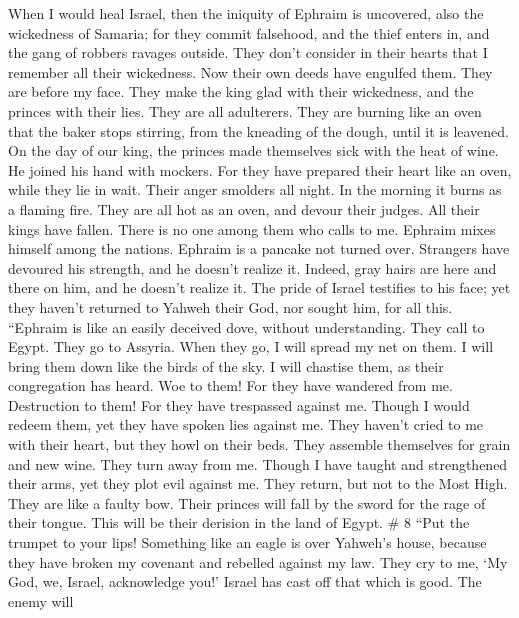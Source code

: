  When I would heal Israel, then the iniquity of Ephraim is
uncovered, also the wickedness of Samaria; for they commit falsehood,
and the thief enters in, and the gang of robbers ravages outside.
 They don't consider in their hearts that I remember all
their wickedness. Now their own deeds have engulfed them. They are
before my face.  They make the king glad with their
wickedness, and the princes with their lies.  They are all
adulterers. They are burning like an oven that the baker stops stirring,
from the kneading of the dough, until it is leavened.  On
the day of our king, the princes made themselves sick with the heat of
wine. He joined his hand with mockers.  For they have
prepared their heart like an oven, while they lie in wait. Their anger
smolders all night. In the morning it burns as a flaming fire.
 They are all hot as an oven, and devour their judges. All
their kings have fallen. There is no one among them who calls to me.
 Ephraim mixes himself among the nations. Ephraim is a
pancake not turned over.  Strangers have devoured his
strength, and he doesn't realize it. Indeed, gray hairs are here and
there on him, and he doesn't realize it.  The pride of
Israel testifies to his face; yet they haven't returned to Yahweh their
God, nor sought him, for all this.  ``Ephraim is like an
easily deceived dove, without understanding. They call to Egypt. They go
to Assyria.  When they go, I will spread my net on them.
I will bring them down like the birds of the sky. I will chastise them,
as their congregation has heard.  Woe to them! For they
have wandered from me. Destruction to them! For they have trespassed
against me. Though I would redeem them, yet they have spoken lies
against me.  They haven't cried to me with their heart,
but they howl on their beds. They assemble themselves for grain and new
wine. They turn away from me.  Though I have taught and
strengthened their arms, yet they plot evil against me. 
They return, but not to the Most High. They are like a faulty bow. Their
princes will fall by the sword for the rage of their tongue. This will
be their derision in the land of Egypt. \# 8  ``Put the
trumpet to your lips! Something like an eagle is over Yahweh's house,
because they have broken my covenant and rebelled against my law.
 They cry to me, `My God, we, Israel, acknowledge you!'
 Israel has cast off that which is good. The enemy will
